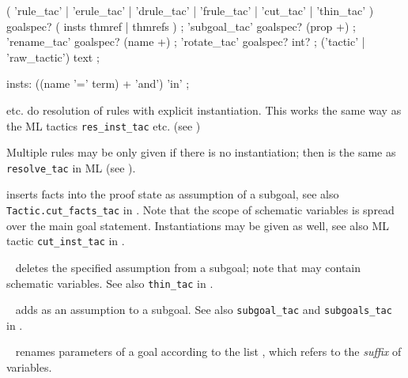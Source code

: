 \begin{isabellebody}
\begin{isamarkuptext}
  \begin{rail}
    ( 'rule\_tac' | 'erule\_tac' | 'drule\_tac' | 'frule\_tac' | 'cut\_tac' | 'thin\_tac' ) goalspec?
    ( insts thmref | thmrefs )
    ;
    'subgoal\_tac' goalspec? (prop +)
    ;
    'rename\_tac' goalspec? (name +)
    ;
    'rotate\_tac' goalspec? int?
    ;
    ('tactic' | 'raw_tactic') text
    ;

    insts: ((name '=' term) + 'and') 'in'
    ;
  \end{rail}

\begin{descr}

  \item [\hyperlink{method.rule-tac}{\mbox{\isa{rule{\isacharunderscore}tac}}} etc.] do resolution of rules with explicit
  instantiation.  This works the same way as the ML tactics \verb|res_inst_tac| etc. (see \cite[\S3]{isabelle-ref})

  Multiple rules may be only given if there is no instantiation; then
  \hyperlink{method.rule-tac}{\mbox{}} is the same as \verb|resolve_tac| in ML (see
  \cite[\S3]{isabelle-ref}).

  \item [\hyperlink{method.cut-tac}{\mbox{\isa{cut{\isacharunderscore}tac}}}] inserts facts into the proof state as
  assumption of a subgoal, see also \verb|Tactic.cut_facts_tac| in
  \cite[\S3]{isabelle-ref}.  Note that the scope of schematic
  variables is spread over the main goal statement.  Instantiations
  may be given as well, see also ML tactic \verb|cut_inst_tac|
  in \cite[\S3]{isabelle-ref}.

  \item [\hyperlink{method.thin-tac}{\mbox{\isa{thin{\isacharunderscore}tac}}}~\isa{{\isasymphi}}] deletes the specified
  assumption from a subgoal; note that \isa{{\isasymphi}} may contain schematic
  variables.  See also \verb|thin_tac| in
  \cite[\S3]{isabelle-ref}.

  \item [\hyperlink{method.subgoal-tac}{\mbox{\isa{subgoal{\isacharunderscore}tac}}}~\isa{{\isasymphi}}] adds \isa{{\isasymphi}} as an
  assumption to a subgoal.  See also \verb|subgoal_tac| and \verb|subgoals_tac| in \cite[\S3]{isabelle-ref}.

  \item [\hyperlink{method.rename-tac}{\mbox{\isa{rename{\isacharunderscore}tac}}}~\isa{{\isachardoublequote}x\isactrlsub {\isadigit{1}}\ {\isasymdots}\ x\isactrlsub n{\isachardoublequote}}] renames
  parameters of a goal according to the list , which refers to the \emph{suffix} of variables.


\end{descr}
\end{isamarkuptext}
\end{isabellebody}
